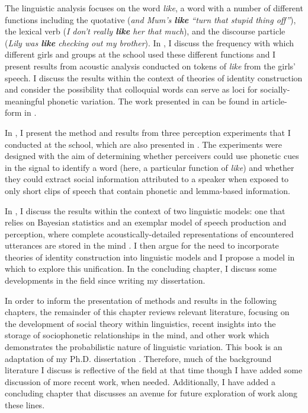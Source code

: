 The linguistic analysis focuses on the word \textit{like}, a word with a number of different functions including the quotative (\textit{and Mum's \textbf{like} ``turn that stupid thing off''}), the lexical verb (\textit{I don't really \textbf{like} her that much}), and the discourse particle (\textit{Lily was \textbf{like} checking out my brother}). In , I discuss the frequency with which different girls and groups at the school used these different functions and I present results from acoustic analysis conducted on tokens of \textit{like} from the girls' speech. I discuss the results within the context of theories of identity construction and consider the possibility that colloquial words can serve as loci for socially-meaningful phonetic variation. The work presented in  can be found in article-form in \citet{drager2011-JPhon}.


In , I present the method and results from three perception experiments that I conducted at the school, which are also presented in \citet{drager2010-LabPhon}. The experiments were designed with the aim of determining whether perceivers could use phonetic cues in the signal to identify a word (here, a particular function of \textit{like}) and whether they could extract social information attributed to a speaker when exposed to only short clips of speech that contain phonetic and lemma-based information. 

In , I discuss the results within the context of two linguistic models: one that relies on Bayesian statistics \citep{jurafsky1996,narayananjurafsky2002} and an exemplar model of speech production and perception, where complete acoustically-detailed representations of encountered utterances are stored in the mind \citep{johnson1997,pisoni1997,pierrehumbert2001}. I then argue for the need to incorporate theories of identity construction into linguistic models and I propose a model in which to explore this unification. In the concluding chapter, I discuss some developments in the field since writing my dissertation.

In order to inform the presentation of methods and results in the following chapters, the remainder of this chapter reviews relevant literature, focusing on the development of social theory within linguistics, recent insights into the storage of sociophonetic relationships in the mind, and other work which demonstrates the probabilistic nature of linguistic variation. This book is an adaptation of my Ph.D. dissertation \citep{drager2009-thesis}. Therefore, much of the background literature I discuss is reflective of the field at that time though I have added some discussion of more recent work, when needed. Additionally, I have added a concluding chapter that discusses an avenue for future exploration of work along these lines.

